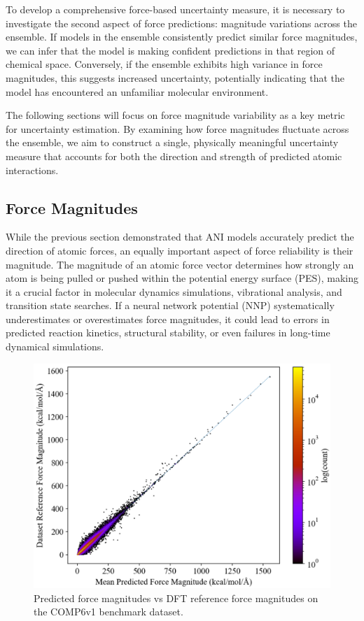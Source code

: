 To develop a comprehensive force-based uncertainty measure, it is necessary to investigate the second aspect of force predictions: magnitude variations across the ensemble. If models in the ensemble consistently predict similar force magnitudes, we can infer that the model is making confident predictions in that region of chemical space. Conversely, if the ensemble exhibits high variance in force magnitudes, this suggests increased uncertainty, potentially indicating that the model has encountered an unfamiliar molecular environment.

The following sections will focus on force magnitude variability as a key metric for uncertainty estimation. By examining how force magnitudes fluctuate across the ensemble, we aim to construct a single, physically meaningful uncertainty measure that accounts for both the direction and strength of predicted atomic interactions.

\subsection{Force Magnitudes}
\label{subsec:force_magnitudes}

While the previous section demonstrated that ANI models accurately predict the direction of atomic forces, an equally important aspect of force reliability is their magnitude. The magnitude of an atomic force vector determines how strongly an atom is being pulled or pushed within the potential energy surface (PES), making it a crucial factor in molecular dynamics simulations, vibrational analysis, and transition state searches. If a neural network potential (NNP) systematically underestimates or overestimates force magnitudes, it could lead to errors in predicted reaction kinetics, structural stability, or even failures in long-time dynamical simulations.

\begin{figure}[H]
    \centering
    \includegraphics[width=1\linewidth]{Images/2xr_forces/2xr_comp6v1_force-dft-vs-mean_ani.png}
    \caption[Mean predicted atomic force magnitude vs DFT reference]{Predicted force magnitudes vs DFT reference force magnitudes on the COMP6v1 benchmark dataset.}
    \label{fig:2xr_comp6v1-forces-ani_vs_ref}
\end{figure}

